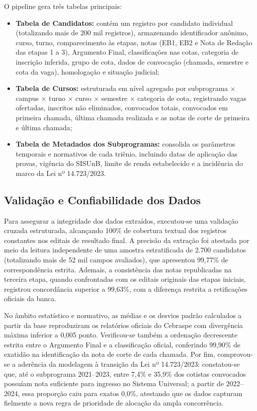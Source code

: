 \documentclass[12pt]{article}
\begin{document}
O pipeline gera três tabelas principais:
\begin{itemize}
    \item \textbf{Tabela de Candidatos:} contém um registro por candidato individual (totalizando mais de 200 mil registros), armazenando identificador anônimo, curso, turno, comparecimento às etapas, notas (EB1, EB2 e Nota de Redação das etapas 1 a 3), Argumento Final, classificações nas cotas, categoria de inscrição inferida, grupo de cota, dados de convocação (chamada, semestre e cota da vaga), homologação e situação judicial;

    \item \textbf{Tabela de Cursos:} estruturada em nível agregado por subprograma $\times$ campus $\times$ turno $\times$ curso $\times$ semestre $\times$ categoria de cota, registrando vagas ofertadas, inscritos não eliminados, convocados totais, convocados em primeira chamada, última chamada realizada e as notas de corte de primeira e última chamada;

    \item \textbf{Tabela de Metadados dos Subprogramas:} consolida os parâmetros temporais e normativos de cada triênio, incluindo datas de aplicação das provas, vigência do SISUnB, limite de renda estabelecido e a incidência do marco da Lei nº 14.723/2023.
\end{itemize}

\subsection{Validação e Confiabilidade dos Dados}

Para assegurar a integridade dos dados extraídos, executou-se uma validação cruzada estruturada, alcançando 100\% de cobertura textual dos registros constantes nos editais de resultado final. A precisão da extração foi atestada por meio da leitura independente de uma amostra estratificada de 2.700 candidatos (totalizando mais de 52 mil campos avaliados), que apresentou 99,77\% de correspondência estrita. Ademais, a consistência das notas republicadas na terceira etapa, quando confrontadas com os editais originais das etapas iniciais, registrou concordância superior a 99,63\%, com a diferença restrita a retificações oficiais da banca.

No âmbito estatístico e normativo, as médias e os desvios padrão calculados a partir da base reproduziram os relatórios oficiais do Cebraspe com divergência máxima inferior a 0,005 ponto. Verificou-se também a ordenação decrescente estrita entre o Argumento Final e a classificação oficial, conferindo 99,90\% de exatidão na identificação da nota de corte de cada chamada. Por fim, comprovou-se a aderência da modelagem à transição da Lei nº 14.723/2023: constatou-se que, até o subprograma 2021--2023, entre 7,4\% e 35,9\% dos cotistas convocados possuíam nota suficiente para ingresso no Sistema Universal; a partir de 2022--2024, essa proporção caiu para exatos 0,0\%, atestando que os dados capturam fielmente a nova regra de prioridade de alocação da ampla concorrência.
\end{document}
